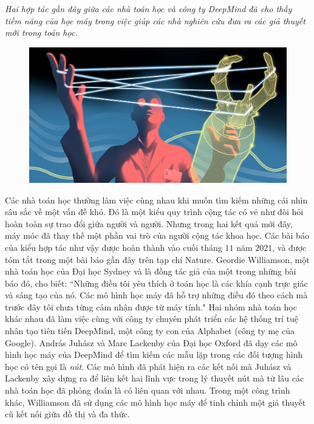 \vspace*{200pt}

\begin{multicols}{2}	
	\textit{Hai hợp tác gần đây giữa các nhà toán học và công ty DeepMind đã cho thấy tiềm năng của học máy trong việc giúp các nhà nghiên cứu đưa ra các giả thuyết mới trong toán học.}
	\begin{figure}[H]
		\centering
		\vspace*{-5pt}
		\captionsetup{labelformat= empty, justification=centering}
		\includegraphics[width=1\linewidth]{1}
		\vspace*{-15pt}
	\end{figure}
	Các nhà toán học thường làm việc cùng nhau khi muốn tìm kiếm những cái nhìn sâu sắc về một vấn đề khó. Đó là một kiểu quy trình cộng tác có vẻ như đòi hỏi hoàn toàn sự trao đổi giữa người và người.
	\vskip 0.05cm
	Nhưng trong hai kết quả mới đây, máy móc đã thay thế một phần vai trò của người cộng tác khoa học. Các bài báo của kiểu hợp tác như vậy được hoàn thành vào cuối tháng $11$ năm $2021$, và được tóm tắt trong một bài báo gần đây trên tạp chí Nature.
	\vskip 0.05cm
	Geordie Williamson, một nhà toán học của Đại học Sydney và là đồng tác giả của một trong những bài báo đó, cho biết: ``Những điều tôi yêu thích ở toán học là các khía cạnh trực giác và sáng tạo của nó. Các mô hình học máy đã hỗ trợ những điều đó theo cách mà trước đây tôi chưa từng cảm nhận được từ máy tính."
	\vskip 0.05cm
	Hai nhóm nhà toán học khác nhau đã làm việc cùng với công ty chuyên phát triển các hệ thống trí tuệ nhân tạo tiên tiến DeepMind, một công ty con của Alphabet (công ty mẹ của Google).
	\vskip 0.05cm
	András Juhász và Marc Lackenby của Đại học Oxford đã dạy các mô hình học máy của DeepMind để tìm kiếm các mẫu lặp trong các đối tượng hình học có tên gọi là \textit{nút}. Các mô hình đã phát hiện ra các kết nối mà Juhász và Lackenby xây dựng ra để liên kết hai lĩnh vực trong lý thuyết nút mà từ lâu các nhà toán học đã phỏng đoán là có liên quan với nhau. Trong một công trình khác, Williamson đã sử dụng các mô hình học máy để tinh chỉnh một giả thuyết cũ kết nối giữa đồ thị và đa thức.

\end{multicols}
